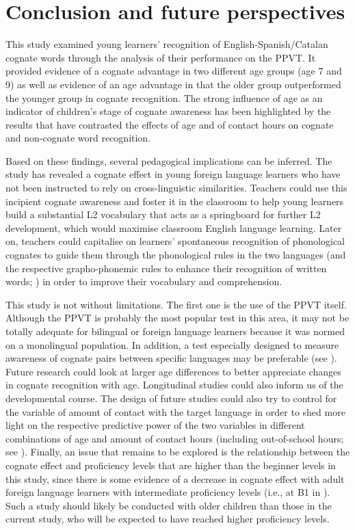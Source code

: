 \documentclass[output=paper,modfonts,nonflat,newtxmath]{langsci/langscibook}
\begin{document}
\section{{Conclusion} \textbf{and} \textbf{future} \textbf{perspectives}}

{This study examined young learners’ recognition of English-Spanish/Catalan cognate words through the analysis of their performance on the PPVT. It provided evidence of a cognate advantage in two different age groups (age 7 and 9) as well as evidence of an age advantage in that the older group outperformed the younger group in cognate recognition. The strong influence of age as an indicator of children’s stage of cognate awareness has been highlighted by the results that have contrasted the effects of age and of contact hours on cognate and non-cognate word recognition.}

 {Based on these findings, several pedagogical implications can be inferred. The study has revealed a cognate effect in young foreign language learners who have not been instructed to rely on cross-linguistic similarities. Teachers could use this incipient cognate awareness and foster it in the classroom to help young learners build a substantial L2 vocabulary that acts as a springboard for further L2 development, which would maximise classroom English language learning. Later on, teachers could capitalise on learners’ spontaneous recognition of phonological cognates to guide them through the phonological rules in the two languages (and the respective grapho-phonemic rules to enhance their recognition of written words; \citealt{LázaroIbarrola2010}) in order to improve their vocabulary and comprehension.}

 {This study is not without limitations. The first one is the use of the PPVT itself. Although the PPVT is probably the most popular test in this area, it may not be totally adequate for bilingual or foreign language learners because it was normed on a monolingual population. In addition, a test especially designed to measure awareness of cognate pairs between specific languages may be preferable (see \citealt{GoriotEtAl2018,LeśniewskaEtAl2018}). Future research could look at larger age differences to better appreciate changes in cognate recognition with age. Longitudinal studies could also inform us of the developmental course. The design of future studies could also try to control for the variable of amount of contact with the target language in order to shed more light on the respective predictive power of the two variables in different combinations of age and amount of contact hours (including out-of-school hours; see \citealt{MuñozEtAl2018}).  Finally, an issue that remains to be explored is the relationship between the cognate effect and proficiency levels that are higher than the beginner levels in this study, since there is some evidence of a decrease in cognate effect with adult foreign language learners with intermediate proficiency levels (i.e., at B1 in \citealt{CasaponsaEtAl2015}). Such a study should likely be conducted with older children than those in the current study, who will be expected to have reached higher proficiency levels.}
\end{document}
